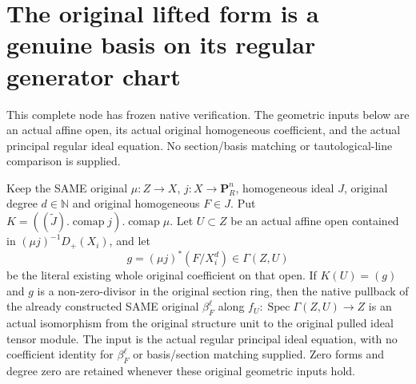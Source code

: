 \section{The original lifted form is a genuine basis on its regular generator chart}

This complete node has frozen native verification.  The geometric inputs below
are an actual affine open, its actual original homogeneous coefficient,
and the actual principal regular ideal equation.  No section/basis matching
or tautological-line comparison is supplied.

\begin{theorem}
\label{thm:resume-original-lifted-form-regular-chart-basis}
\leanok
Keep the SAME original $\mu:Z\to X$, $j:X\to\mathbf P_R^n$,
homogeneous ideal $J$, original degree $d\in\mathbb N$ and original
homogeneous $F\in J$.  Put $K=((\widetilde J).\operatorname{comap}j).
\operatorname{comap}\mu$.
Let $U\subset Z$ be an actual affine open contained in
$(\mu j)^{-1}D_+(X_i)$, and let
\[
 g=(\mu j)^*(F/X_i^d)\in\Gamma(Z,U)
\]
be the literal existing whole original coefficient on that open.
If $K(U)=(g)$ and $g$ is a non-zero-divisor in the original section ring,
then the native pullback of the already constructed SAME original
$\beta_F^\ell$ along $f_U:\operatorname{Spec}\Gamma(Z,U)\to Z$ is an
actual isomorphism from the original structure unit to the original
pulled ideal tensor module.  The input is the actual regular principal
ideal equation, with no coefficient identity for $\beta_F^\ell$ or
basis/section matching supplied.  Zero forms and degree zero are
retained whenever these original geometric inputs hold.
\end{theorem}
